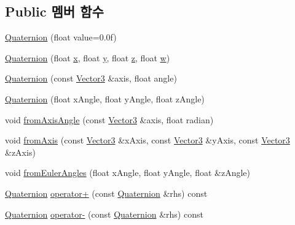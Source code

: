 \subsection*{Public 멤버 함수}
\begin{DoxyCompactItemize}
\item 
\hyperlink{classcpf_1_1_quaternion_aae3cc98fcdb7a419a29db4ee988972bc}{Quaternion} (float value=0.\+0f)
\item 
\hyperlink{classcpf_1_1_quaternion_ad50037ab0bea9e9ea33296f4ca081204}{Quaternion} (float \hyperlink{classcpf_1_1_quaternion_a200f7bce4e673281af8cc7dd75cb0677}{x}, float \hyperlink{classcpf_1_1_quaternion_a4fbade6e58be55a49c94e7f157988136}{y}, float \hyperlink{classcpf_1_1_quaternion_ade9c41b717605118e5fdf95d96a843b4}{z}, float \hyperlink{classcpf_1_1_quaternion_af312a196b39bb4903b876bc454ac15f8}{w})
\item 
\hyperlink{classcpf_1_1_quaternion_a1667174c0626cdd7319cb4f5ec552db3}{Quaternion} (const \hyperlink{namespacecpf_a50675f369f5384c7543c7672e3441ba0}{Vector3} \&axis, float angle)
\item 
\hyperlink{classcpf_1_1_quaternion_a480873e169c88e8e6a53b268cd3b2505}{Quaternion} (float x\+Angle, float y\+Angle, float z\+Angle)
\item 
void \hyperlink{classcpf_1_1_quaternion_a7d0860d74452a6b5de4ea70357bf3d95}{from\+Axis\+Angle} (const \hyperlink{namespacecpf_a50675f369f5384c7543c7672e3441ba0}{Vector3} \&axis, float radian)
\item 
void \hyperlink{classcpf_1_1_quaternion_ae9fbd4524f10dd2b2cd6108cf6adbd22}{from\+Axis} (const \hyperlink{namespacecpf_a50675f369f5384c7543c7672e3441ba0}{Vector3} \&x\+Axis, const \hyperlink{namespacecpf_a50675f369f5384c7543c7672e3441ba0}{Vector3} \&y\+Axis, const \hyperlink{namespacecpf_a50675f369f5384c7543c7672e3441ba0}{Vector3} \&z\+Axis)
\item 
void \hyperlink{classcpf_1_1_quaternion_a7cf9179b0d364d55c501666af142086a}{from\+Euler\+Angles} (float x\+Angle, float y\+Angle, float \&z\+Angle)
\item 
\hyperlink{classcpf_1_1_quaternion}{Quaternion} \hyperlink{classcpf_1_1_quaternion_a9e55ee3dded0a62bd7374bd058c51ec9}{operator+} (const \hyperlink{classcpf_1_1_quaternion}{Quaternion} \&rhs) const
\item 
\hyperlink{classcpf_1_1_quaternion}{Quaternion} \hyperlink{classcpf_1_1_quaternion_aa16967dd4f4d49018ef64e5b0e88b3fd}{operator-\/} (const \hyperlink{classcpf_1_1_quaternion}{Quaternion} \&rhs) const
\item 

\end{DoxyCompactItemize}
